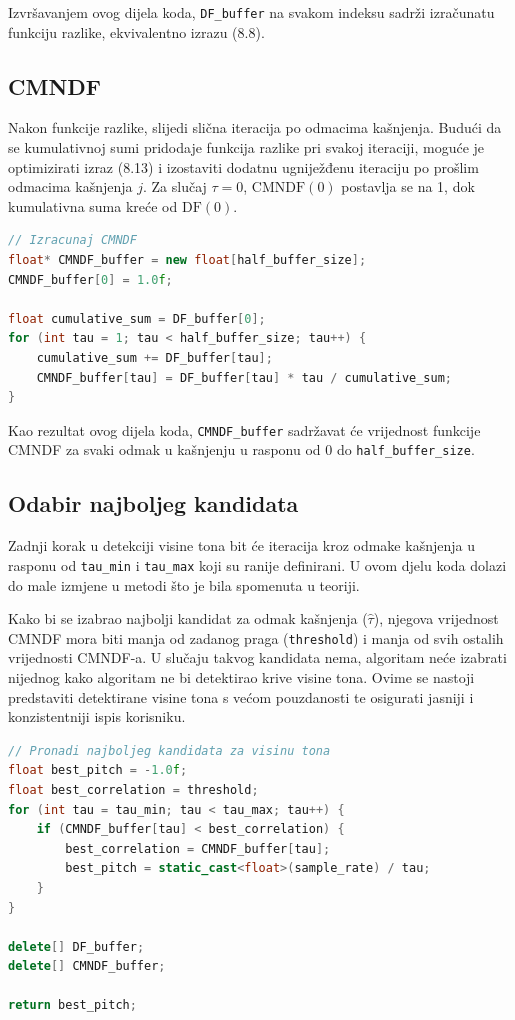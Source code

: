 \documentclass[times, utf8, diplomski, numeric]{fer}
\begin{document}
Izvršavanjem ovog dijela koda, \lstinline[basicstyle=\ttfamily]|DF_buffer| na svakom indeksu sadrži izračunatu funkciju razlike, ekvivalentno izrazu (8.8).	

\subsection{CMNDF}
%
Nakon funkcije razlike, slijedi slična iteracija po odmacima kašnjenja. Budući da se kumulativnoj sumi pridodaje funkcija razlike pri svakoj iteraciji, moguće je optimizirati izraz (8.13) i izostaviti dodatnu ugniježđenu iteraciju po prošlim odmacima kašnjenja $j$. Za slučaj $\tau = 0$, $\mathrm{CMNDF}(0)$ postavlja se na 1, dok kumulativna suma kreće od $\mathrm{DF}(0)$.

\begin{lstlisting}[language=C++, frame=single]
// Izracunaj CMNDF
float* CMNDF_buffer = new float[half_buffer_size];
CMNDF_buffer[0] = 1.0f;

float cumulative_sum = DF_buffer[0];
for (int tau = 1; tau < half_buffer_size; tau++) {
	cumulative_sum += DF_buffer[tau];
	CMNDF_buffer[tau] = DF_buffer[tau] * tau / cumulative_sum;
}
\end{lstlisting}

Kao rezultat ovog dijela koda, \lstinline[basicstyle=\ttfamily]|CMNDF_buffer| sadržavat će vrijednost funkcije CMNDF za svaki odmak u kašnjenju u rasponu od 0 do \lstinline[basicstyle=\ttfamily]|half_buffer_size|.

\subsection{Odabir najboljeg kandidata}
%
Zadnji korak u detekciji visine tona bit će iteracija kroz odmake kašnjenja u rasponu od \lstinline[basicstyle=\ttfamily]|tau_min| i \lstinline[basicstyle=\ttfamily]|tau_max| koji su ranije definirani. U ovom djelu koda dolazi do male izmjene u metodi što je bila spomenuta u teoriji.

Kako bi se izabrao najbolji kandidat za odmak kašnjenja ($\hat{\tau}$), njegova vrijednost CMNDF mora biti manja od zadanog praga (\lstinline[basicstyle=\ttfamily]|threshold|) i manja od svih ostalih vrijednosti CMNDF-a. U slučaju takvog kandidata nema, algoritam neće izabrati nijednog kako algoritam ne bi detektirao krive visine tona. Ovime se nastoji predstaviti detektirane visine tona s većom pouzdanosti te osigurati jasniji i konzistentniji ispis korisniku.

\begin{lstlisting}[language=C++, frame=single]
// Pronadi najboljeg kandidata za visinu tona
float best_pitch = -1.0f;
float best_correlation = threshold;
for (int tau = tau_min; tau < tau_max; tau++) {
	if (CMNDF_buffer[tau] < best_correlation) {
		best_correlation = CMNDF_buffer[tau];
		best_pitch = static_cast<float>(sample_rate) / tau;
	}
}

delete[] DF_buffer;
delete[] CMNDF_buffer;

return best_pitch;
\end{lstlisting}
\end{document}
